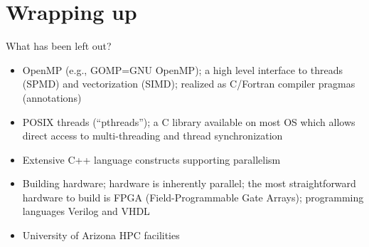 \documentclass[pdflatex,colorlinks,landscape]{beamer}
\renewcommand\emph[1]{{\color{magenta}#1}}
\begin{document}
\section{Wrapping up}

\begin{frame}{What has been left out?}
  \begin{itemize}
  \item \emph{OpenMP} (e.g., GOMP=GNU OpenMP); a high
    level interface to threads (SPMD) and
    vectorization (SIMD); realized as C/Fortran compiler
    \emph{pragmas} (annotations)
  \item \emph{POSIX threads} (``pthreads''); a C library available on most OS
    which allows direct access to multi-threading and
    thread synchronization
  \item Extensive \emph{C++ language} constructs supporting parallelism
  \item \emph{Building hardware}; hardware is inherently parallel;
    the most straightforward hardware to build is FPGA (Field-Programmable Gate Arrays);
    programming languages \emph{Verilog} and \emph{VHDL}
  \item University of Arizona \emph{HPC facilities}
  \end{itemize}
\end{frame}
\end{document}
